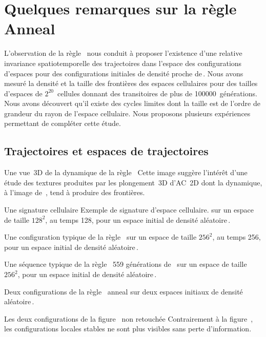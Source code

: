 \chapter[remarques sur la règle Anneal]%
{Quelques remarques sur la règle Anneal}

L'observation de la règle~ nous conduit à proposer l'existence
d'une relative invariance spatiotemporelle des trajectoires dans
l'espace des configurations d'espaces pour des configurations initiales
de densité proche de\,\undemi. %
Nous avons mesuré la densité et la taille des frontières des espaces
cellulaires pour des tailles d'espaces de $2^{20}$~cellules donnant
des transitoires de plus de 100000~générations. %
Nous avons découvert qu'il existe des cycles limites dont la taille
est de l'ordre de grandeur du rayon de l'espace cellulaire. %
Nous proposons plusieurs expériences permettant de compléter cette
étude. %

\section{Trajectoires et espaces de trajectoires}

%
{}%
{Une vue~3D de la dynamique de la règle~}%
{Cette image suggère l'intérêt d'une étude des textures produites par
  les plongement~3D d'AC~2D dont la dynamique, à l'image
  de~, tend à produire des frontières.}

%
{Une signature cellulaire}%
{Exemple de signature d'espace cellulaire.}%
{ sur un espace de taille $128^2$, au temps 128, pour un espace
  initial de densité aléatoire\,\Sundemi.}

%
{}%
{Une configuration typique de la règle~}%
{ sur un espace de taille $256^2$, au temps 256,
  pour un espace initial de densité aléatoire\,\Sundemi.}

%
{}%
{Une séquence typique de la règle~}%
{559 générations de~ sur un espace de taille $256^2$,
  pour un espace initial de densité aléatoire\,\Sundemi.}

%
{}%
{Deux configurations de la règle~}%
{anneal sur deux espaces initiaux de densité aléatoire\,\Sundemi.}

%
{}%
{Les deux configurations de la figure~\protect{} non retouchée}%
{Contrairement à la figure~, les configurations
  locales stables ne sont plus visibles sans perte d'information.}

